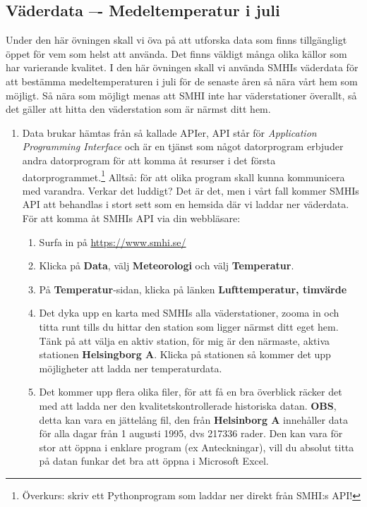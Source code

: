 \documentclass{article}
\begin{document}
\subsection{Väderdata –- Medeltemperatur i juli}
Under den här övningen skall vi öva på att utforska data som finns tillgängligt öppet för vem som helst att använda. Det finns väldigt många olika källor som har varierande kvalitet. I den här övningen skall vi använda SMHIs väderdata för att bestämma medeltemperaturen i juli för de senaste åren så nära vårt hem som möjligt. Så nära som möjligt menas att SMHI inte har väderstationer överallt, så det gäller att hitta den väderstation som är närmst ditt hem.
\begin{enumerate}
    \item Data brukar hämtas från så kallade APIer, API står för \emph{Application Programming Interface} och är en tjänst som något datorprogram erbjuder andra datorprogram för att komma åt resurser i det första datorprogrammet.\footnote{Överkurs: skriv ett Pythonprogram som laddar ner direkt från SMHI:s API!} Alltså: för att olika program skall kunna kommunicera med varandra. Verkar det luddigt? Det är det, men i vårt fall kommer SMHIs API att behandlas i stort sett som en hemsida där vi laddar ner väderdata. För att komma åt SMHIs API via din webbläsare:
    \begin{enumerate}
        \item Surfa in på \url{https://www.smhi.se/}
        \item Klicka på \textbf{Data}, välj \textbf{Meteorologi} och välj \textbf{Temperatur}.
        \item På \textbf{Temperatur}-sidan, klicka på länken \textbf{Lufttemperatur, timvärde}
        \item Det dyka upp en karta med SMHIs alla väderstationer, zooma in och titta runt tills du hittar den station som ligger närmst ditt eget hem. Tänk på att välja en aktiv station, för mig är den närmaste, aktiva stationen \textbf{Helsingborg A}. Klicka på stationen så kommer det upp möjligheter att ladda ner temperaturdata.
        \item Det kommer upp flera olika filer, för att få en bra överblick räcker det med att ladda ner den kvalitetskontrollerade historiska datan. \textbf{OBS}, detta kan vara en jättelång fil, den från \textbf{Helsinborg A} innehåller data för alla dagar från 1 augusti 1995, dvs 217336 rader. Den kan vara för stor att öppna i enklare program (ex Anteckningar), vill du absolut titta på datan funkar det bra att öppna i Microsoft Excel.

\end{enumerate}
\end{enumerate}
\end{document}

